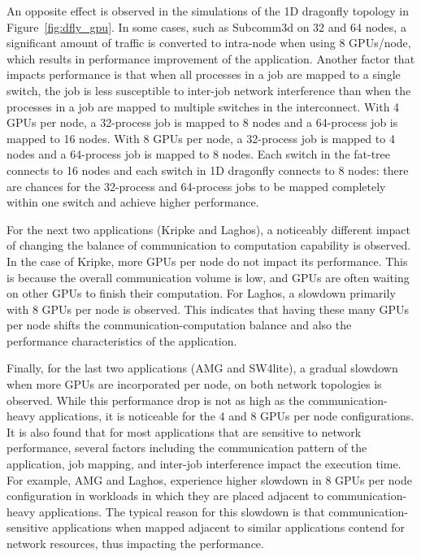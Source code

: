 An opposite effect is observed in the simulations of the 1D dragonfly
topology in Figure~\ref{fig:dfly_gpu}. In some cases, such as Subcomm3d on
32 and 64 nodes, a significant amount of traffic is converted to intra-node
when using 8 GPUs/node, which results in performance improvement of the
application.  Another factor that impacts performance is that when all
processes in a job are mapped to a single switch, the job is less
susceptible to inter-job network interference than when the processes in a
job are mapped to multiple switches in the interconnect.  With 4 GPUs per
node, a 32-process job is mapped to 8 nodes and a 64-process job is mapped
to 16 nodes.  With 8 GPUs per node, a 32-process job is mapped to 4 nodes
and a 64-process job is mapped to 8 nodes.  Each switch in the fat-tree
connects to 16 nodes and each switch in 1D dragonfly connects to 8 nodes:
there are chances for the 32-process and 64-process jobs to be mapped
completely within one switch and achieve higher performance.  

For the next two applications (Kripke and Laghos), a noticeably
different impact of changing the balance of communication to computation
capability is observed. In the case of Kripke, more GPUs per node do not impact its performance. This
is because the overall communication volume is low, and GPUs are often waiting
on other GPUs to finish their computation. For Laghos, a
slowdown primarily with 8 GPUs per node is observed. This indicates that having these many
GPUs per node shifts the communication-computation balance and also the performance 
characteristics of the application.

Finally, for the last two applications (AMG and SW4lite), a gradual
slowdown when more GPUs are incorporated per node, on both network topologies is observed. While this performance drop
is not as high as the communication-heavy applications, it is noticeable for the 4
and 8 GPUs per node configurations.  It is also found that for most
applications that are sensitive to network performance, several factors
including the communication pattern of the application, job mapping, and
inter-job interference impact the execution time. For example, AMG and Laghos,
experience higher slowdown in 8 GPUs per node configuration in workloads in
which they are placed adjacent to communication-heavy applications. 
The typical reason for
this slowdown is that communication-sensitive applications when mapped
adjacent to similar applications contend for network resources, thus impacting
the performance.

